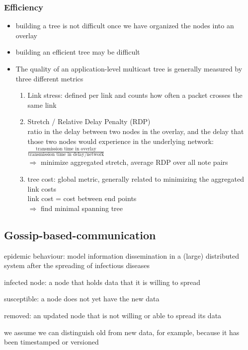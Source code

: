 \documentclass[ngerman,a4paper]{report}
\begin{document}
\subsubsection*{Efficiency}

\begin{itemize}
	\item building a tree is not difficult once we have organized the nodes into an overlay
	\item building an efficient tree may be difficult
	\item The quality of an application-level multicast tree is generally measured by three different metrics
	\begin{enumerate}
		\item Link stress: defined per link and counts how often a packet crosses the same link
		\item Stretch / Relative Delay Penalty (RDP)\\
			ratio in the delay between two nodes in the overlay, and the delay that those two nodes would experience in the underlying network: 
			$\frac{\text{transmission time in overlay}}{\text{transmission time in delay/network}}$ \\
			$\Rightarrow$ minimize aggregated stretch, average RDP over all note pairs
		\item tree cost: global metric, generally related to minimizing the aggregated link costs \\
			link cost = cost between end points\\
				$\Rightarrow$ find minimal spanning tree	
	\end{enumerate}
\end{itemize}

\subsection{Gossip-based-communication}
\begin{compactitem}
	\item epidemic behaviour: model information dissemination in a (large) distributed system after the spreading of infectious diseases
	\item infected node: a node that holds data that it is willing to spread 
	\item susceptible: a node does not yet have the new data
	\item removed: an updated node that is not willing or able to spread its data 
	\item we assume we can distinguish old from new data, for example, because it has been timestamped or versioned
\end{compactitem}
\end{document}
